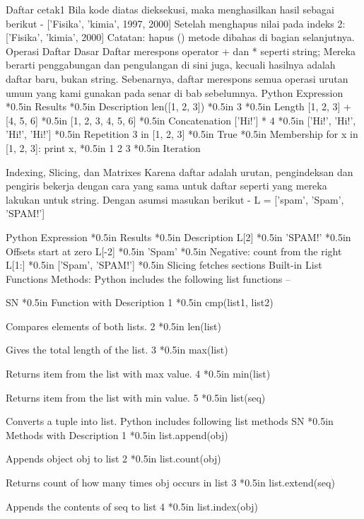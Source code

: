 Daftar cetak1 
Bila kode diatas dieksekusi, maka menghasilkan hasil sebagai berikut - 
['Fisika', 'kimia', 1997, 2000] 
Setelah menghapus nilai pada indeks 2: 
['Fisika', 'kimia', 2000] 
Catatan: hapus () metode dibahas di bagian selanjutnya. 
Operasi Daftar Dasar 
Daftar merespons operator + dan * seperti string; Mereka berarti penggabungan dan pengulangan di sini juga, kecuali hasilnya adalah daftar baru, bukan string. 
Sebenarnya, daftar merespons semua operasi urutan umum yang kami gunakan pada senar di bab sebelumnya. 
Python Expression *{0.5in} Results  *{0.5in} Description 
len([1, 2, 3]) *{0.5in} 3 *{0.5in} Length 
[1, 2, 3] + [4, 5, 6] *{0.5in} [1, 2, 3, 4, 5, 6] *{0.5in} Concatenation 
['Hi!'] * 4 *{0.5in} ['Hi!', 'Hi!', 'Hi!', 'Hi!'] *{0.5in} Repetition 
3 in [1, 2, 3] *{0.5in} True *{0.5in} Membership 
for x in [1, 2, 3]: print x, *{0.5in} 1 2 3 *{0.5in} Iteration 

Indexing, Slicing, dan Matrixes 
Karena daftar adalah urutan, pengindeksan dan pengiris bekerja dengan cara yang sama untuk daftar seperti yang mereka lakukan untuk string. 
Dengan asumsi masukan berikut - 
L = ['spam', 'Spam', 'SPAM!'] 
  
Python Expression *{0.5in} Results  *{0.5in} Description 
L[2] *{0.5in} 'SPAM!' *{0.5in} Offsets start at zero 
L[-2] *{0.5in} 'Spam' *{0.5in} Negative: count from the right 
L[1:] *{0.5in} ['Spam', 'SPAM!'] *{0.5in} Slicing fetches sections 
Built-in List Functions       Methods: 
Python includes the following list functions – 

SN *{0.5in} Function with Description 
1 *{0.5in} cmp(list1, list2) 

Compares elements of both lists. 
2 *{0.5in} len(list) 

Gives the total length of the list. 
3 *{0.5in} max(list) 

Returns item from the list with max value. 
4 *{0.5in} min(list) 

Returns item from the list with min value. 
5 *{0.5in} list(seq) 

Converts a tuple into list. 
Python includes following list methods 
SN *{0.5in} Methods with Description 
1 *{0.5in} list.append(obj) 

Appends object obj to list 
2 *{0.5in} list.count(obj) 

Returns count of how many times obj occurs in list 
3 *{0.5in} list.extend(seq) 

Appends the contents of seq to list 
4 *{0.5in} list.index(obj) 

